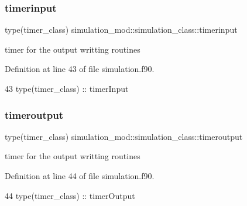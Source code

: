 \subsubsection{\texorpdfstring{timerinput}{timerinput}}
{\footnotesize\ttfamily type(timer\+\_\+class) simulation\+\_\+mod\+::simulation\+\_\+class\+::timerinput\hspace{0.3cm}{\ttfamily [private]}}



timer for the output writting routines 



Definition at line 43 of file simulation.\+f90.


\begin{DoxyCode}
43         \textcolor{keywordtype}{type}(timer\_class) :: timerInput
\end{DoxyCode}
\mbox{\label{structsimulation__mod_1_1simulation__class_a8273da2899310646a161fedc96434bf9}} 
\subsubsection{\texorpdfstring{timeroutput}{timeroutput}}
{\footnotesize\ttfamily type(timer\+\_\+class) simulation\+\_\+mod\+::simulation\+\_\+class\+::timeroutput\hspace{0.3cm}{\ttfamily [private]}}



timer for the output writting routines 



Definition at line 44 of file simulation.\+f90.


\begin{DoxyCode}
44         \textcolor{keywordtype}{type}(timer\_class) :: timerOutput
\end{DoxyCode}
\mbox{\label{structsimulation__mod_1_1simulation__class_ac759ee5fda4ddfb16deeb833c59709e3}} 
